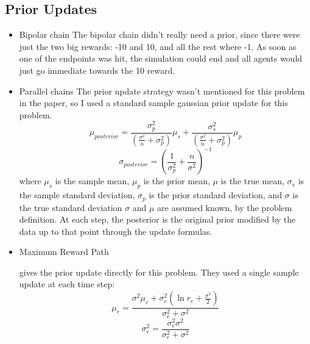 \documentclass{article}
\begin{document}
\subsection{Prior Updates}

  \begin{itemize}
  \item Bipolar chain
  The bipolar chain didn't really need a prior, since there were just the two big rewards: -10 and 10, and all the rest where -1. As soon as one of the endpoints was hit, the simulation could end and all agents would just go immediate towards the 10 reward.
  
  \item Parallel chains
 The prior update strategy wasn't mentioned for this problem in the paper, so  I used a standard sample gaussian prior update for this problem.
 $$\mu_{posterior} = \frac{\sigma_p^2}{(\frac{\sigma^2}{n} + \sigma_p^2)} \mu_s + \frac{\sigma_s^2}{(\frac{\sigma^2}{n} + \sigma_p^2)} \mu_p$$
 $$\sigma_{posterior} = ( \frac{1}{\sigma_p^2} + \frac{n}{\sigma^2})^{-1}$$
 where $\mu_s$ is the sample mean, $\mu_p$ is the prior mean, $\mu$ is the true mean, $\sigma_s$ is the sample standard deviation, $\sigma_p$ is the prior standard deviation, and $\sigma$ is the true standard deviation $\sigma$ and $\mu$ are assumed known, by the problem definition. At each step, the posterior is the original prior modified by the data up to that point through the update formulas.
  
  \item Maximum Reward Path
  
  \cite{SeedSampling} gives the prior update directly for this problem. They used a single sample update at each time step:
  $$\mu_e = \frac{\sigma^2 \mu_e + \sigma_e^2(\ln{r_e} + \frac{\sigma^2}{2}) }{\sigma_e^2+\sigma^2}$$
  $$\sigma_e^2 = \frac{\sigma_e^2 \sigma^2}{\sigma_e^2 + \sigma^2}$$
  \end{itemize}
\end{document}
